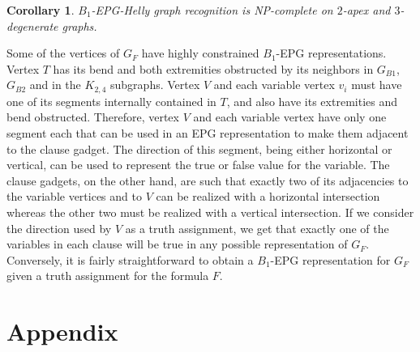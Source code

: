 \documentclass[9pt]{entcs}
\newtheorem{coro}{Corollary}[section]
\newtheorem{prove}{Proof}[section]
\begin{document}
\begin{coro}\label{coro:2apexAnd3degenerate}
{\sc $B_{1}$-EPG-Helly graph recognition} is NP-complete on $2$-apex and $3$-degenerate graphs.
\end{coro}


Some of the vertices of $G_F$ have highly constrained $B_1$-EPG representations. Vertex $T$ has its bend	and both extremities	obstructed	by its neighbors in	$G_{B1}$, $G_{B2}$ and in the $K_{2,4}$
subgraphs. Vertex $V$ and each variable vertex $v_i$ must have one of its segments internally contained in $T$, and also have its extremities and bend obstructed.  Therefore, vertex $V$ and each
variable vertex have only one segment each that can be used in an EPG
representation to make them adjacent to the clause gadget. The direction of
this segment, being either horizontal	or vertical, can be used to represent
the true or false value	for the	variable.
The clause gadgets, on the other hand, are such that exactly two of its
adjacencies to the variable vertices and to $V$ can be realized with a
horizontal intersection whereas  the other two must be realized with a
vertical intersection. If we consider the direction used by $V$ as a
truth assignment, we get that exactly one of the variables in each clause
will be	true in	any possible representation of $G_F$. Conversely, it is	fairly
straightforward to obtain a $B_1$-EPG representation for $G_F$ given a truth assignment	for
the formula $F$.









\cleardoublepage
\newpage

\section{Appendix}
\end{document}
